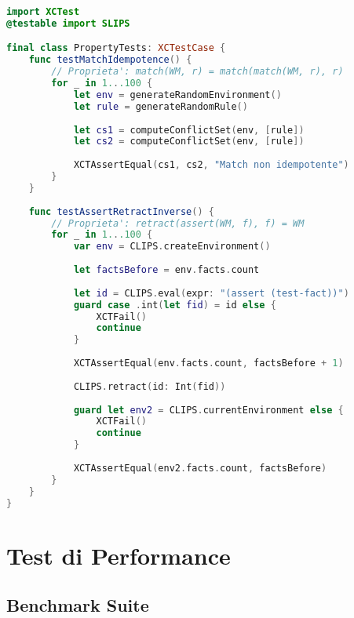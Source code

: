 \begin{lstlisting}[language=Swift]
import XCTest
@testable import SLIPS

final class PropertyTests: XCTestCase {
    func testMatchIdempotence() {
        // Proprieta': match(WM, r) = match(match(WM, r), r)
        for _ in 1...100 {
            let env = generateRandomEnvironment()
            let rule = generateRandomRule()
            
            let cs1 = computeConflictSet(env, [rule])
            let cs2 = computeConflictSet(env, [rule])
            
            XCTAssertEqual(cs1, cs2, "Match non idempotente")
        }
    }
    
    func testAssertRetractInverse() {
        // Proprieta': retract(assert(WM, f), f) = WM
        for _ in 1...100 {
            var env = CLIPS.createEnvironment()
            
            let factsBefore = env.facts.count
            
            let id = CLIPS.eval(expr: "(assert (test-fact))")
            guard case .int(let fid) = id else {
                XCTFail()
                continue
            }
            
            XCTAssertEqual(env.facts.count, factsBefore + 1)
            
            CLIPS.retract(id: Int(fid))
            
            guard let env2 = CLIPS.currentEnvironment else {
                XCTFail()
                continue
            }
            
            XCTAssertEqual(env2.facts.count, factsBefore)
        }
    }
}
\end{lstlisting}

\section{Test di Performance}

\subsection{Benchmark Suite}

